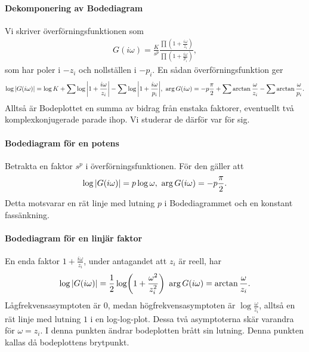 \paragraph{Dekomponering av Bodediagram}
Vi skriver överförningsfunktionen som
\begin{align*}
	G(i\omega) = \frac{K}{s^{p}}\frac{\prod\left(1 +\frac{i\omega}{z_{i}}\right)}{\prod\left(1 +\frac{i\omega}{p_{i}}\right)},
\end{align*}
som har poler i $-z_{i}$ och nollställen i $-p_{i}$. En sådan överförningsfunktion ger
\begin{align*}
	\log{\abs{G(i\omega)}} = \log{K} + \sum\log{\abs{1 +\frac{i\omega}{z_{i}}}} - \sum\log{\abs{1 +\frac{i\omega}{p_{i}}}},\ \arg{G(i\omega)} = -p\frac{\pi}{2} + \sum\arctan{\frac{\omega}{z_{i}}} - \sum\arctan{\frac{\omega}{p_{i}}}.
\end{align*}
Alltså är Bodeplottet en summa av bidrag från enstaka faktorer, eventuellt två komplexkonjugerade parade ihop. Vi studerar de därför var för sig.

\paragraph{Bodediagram för en potens}
Betrakta en faktor $s^{p}$ i överförningsfunktionen. För den gäller att
\begin{align*}
	\log{\abs{G(i\omega)}} = p\log{\omega},\ \arg{G(i\omega)} = -p\frac{\pi}{2}.
\end{align*}
Detta motsvarar en rät linje med lutning $p$ i Bodediagrammet och en konstant fassänkning.

\paragraph{Bodediagram för en linjär faktor}
En enda faktor $1 +\frac{i\omega}{z_{i}}$, under antagandet att $z_{i}$ är reell, har
\begin{align*}
	\log{\abs{G(i\omega)}} = \frac{1}{2}\log(1 + \frac{\omega^{2}}{z_{i}^{2}})\ \arg{G(i\omega)} = \arctan{\frac{\omega}{z_{i}}}.
\end{align*}
Lågfrekvensasymptoten är $0$, medan högfrekvensasymptoten är $\log{\frac{\omega}{z_{i}}}$, alltså en rät linje med lutning $1$ i en log-log-plot. Dessa två asymptoterna skär varandra för $\omega = z_{i}$. I denna punkten ändrar bodeplotten brått sin lutning. Denna punkten kallas då bodeplottens brytpunkt.

